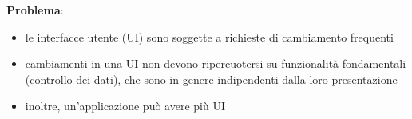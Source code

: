 \vspace{4mm}
\noindent \textbf{Problema}:
\begin{itemize}
    \item le interfacce utente (UI) sono soggette a richieste di cambiamento frequenti
    \item cambiamenti in una UI non devono ripercuotersi su funzionalità fondamentali (controllo dei dati), che sono in genere indipendenti dalla loro presentazione
    \item inoltre, un’applicazione può avere più UI
\end{itemize}
